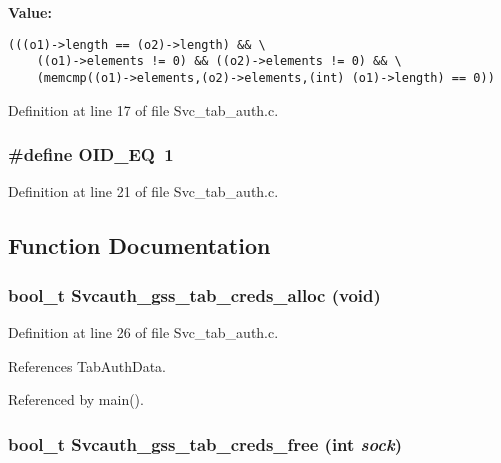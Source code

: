 {\bf Value:}

\footnotesize\begin{verbatim}(((o1)->length == (o2)->length) && \
    ((o1)->elements != 0) && ((o2)->elements != 0) && \
    (memcmp((o1)->elements,(o2)->elements,(int) (o1)->length) == 0))
\end{verbatim}\normalsize 


Definition at line 17 of file Svc\_\-tab\_\-auth.c.
\subsubsection{\setlength{\rightskip}{0pt plus 5cm}\#define OID\_\-EQ\ 1}\label{Svc__tab__auth_8c_a1}




Definition at line 21 of file Svc\_\-tab\_\-auth.c.

\subsection{Function Documentation}
\subsubsection{\setlength{\rightskip}{0pt plus 5cm}bool\_\-t Svcauth\_\-gss\_\-tab\_\-creds\_\-alloc (void)}\label{Svc__tab__auth_8c_a3}




Definition at line 26 of file Svc\_\-tab\_\-auth.c.

References Tab\-Auth\-Data.

Referenced by main().
\subsubsection{\setlength{\rightskip}{0pt plus 5cm}bool\_\-t Svcauth\_\-gss\_\-tab\_\-creds\_\-free (int {\em sock})}\label{Svc__tab__auth_8c_a4}




